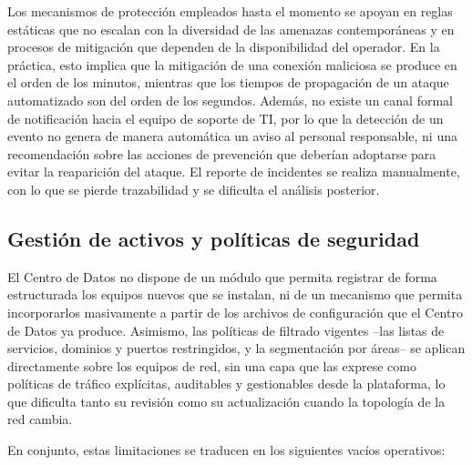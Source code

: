 Los mecanismos de protecci\'on empleados hasta el momento se apoyan en reglas est\'aticas que no escalan con la diversidad de las amenazas contempor\'aneas y en procesos de mitigaci\'on que dependen de la disponibilidad del operador. En la pr\'actica, esto implica que la mitigaci\'on de una conexi\'on maliciosa se produce en el orden de los minutos, mientras que los tiempos de propagaci\'on de un ataque automatizado son del orden de los segundos. Adem\'as, no existe un canal formal de notificaci\'on hacia el equipo de soporte de TI, por lo que la detecci\'on de un evento no genera de manera autom\'atica un aviso al personal responsable, ni una recomendaci\'on sobre las acciones de prevenci\'on que deber\'ian adoptarse para evitar la reaparici\'on del ataque. El reporte de incidentes se realiza manualmente, con lo que se pierde trazabilidad y se dificulta el an\'alisis posterior.

\subsection{Gesti\'on de activos y pol\'iticas de seguridad}

El Centro de Datos no dispone de un m\'odulo que permita registrar de forma estructurada los equipos nuevos que se instalan, ni de un mecanismo que permita incorporarlos masivamente a partir de los archivos de configuraci\'on que el Centro de Datos ya produce. Asimismo, las pol\'iticas de filtrado vigentes --las listas de servicios, dominios y puertos restringidos, y la segmentaci\'on por \'areas-- se aplican directamente sobre los equipos de red, sin una capa que las exprese como pol\'iticas de tr\'afico expl\'icitas, auditables y gestionables desde la plataforma, lo que dificulta tanto su revisi\'on como su actualizaci\'on cuando la topolog\'ia de la red cambia.

En conjunto, estas limitaciones se traducen en los siguientes vac\'ios operativos:

